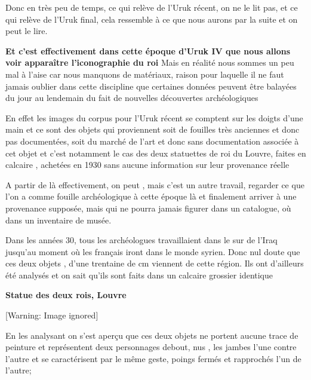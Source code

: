 \documentclass[a4paper,10pt]{article}
\begin{document}
Donc en très peu de temps, ce qui relève de l'Uruk récent, on ne le lit pas, 
et ce qui relève de l'Uruk final, cela ressemble à ce que nous aurons par la 
suite et on peut le lire.






\textbf{Et c'est effectivement dans cette époque
d'Uruk IV que nous allons voir apparaître
l'iconographie du roi} Mais en réalité nous sommes un
peu mal à l'aise car nous manquons de matériaux,
raison pour laquelle il ne faut jamais oublier dans cette discipline
que certaines données peuvent être balayées du jour au lendemain du
fait de nouvelles découvertes archéologiques

En effet les images du corpus pour l'Uruk récent se
comptent sur les doigts d'une main et ce sont des
objets qui proviennent soit de fouilles très anciennes et donc pas
documentées, soit du marché de l'art et donc sans
documentation associée à cet objet et c'est notamment
le cas des deux statuettes de roi du Louvre, faites en calcaire ,
achetées en 1930 sans aucune information sur leur provenance réelle

A partir de là effectivement, on peut , mais c'est un
autre travail, regarder ce que l'on a comme fouille
archéologique à cette époque là et finalement arriver à une provenance
supposée, mais qui ne pourra jamais figurer dans un catalogue, où dans
un inventaire de musée.

Dans les années 30, tous les archéologues travaillaient dans le sur de
l'Iraq jusqu'au moment où les
français iront dans le monde syrien. Donc nul doute que ces deux objets
, d'une trentaine de cm viennent de cette région. Ils
ont d'ailleurs été analysés et on sait
qu'ils sont faits dans un calcaire grossier identique

\textbf{Statue des deux rois, Louvre}

  [Warning: Image ignored] %
 

En les analysant on s'est aperçu que ces deux objets ne
portent aucune trace de peinture et représentent deux personnages
debout, nus , les jambes l'une contre
l'autre et se caractérisent par le même geste,  poings
fermés et rapprochés l'un de l'autre;
\end{document}
